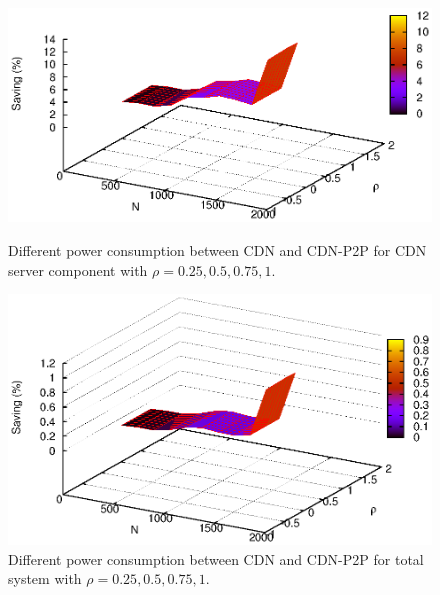 \documentclass[conference]{IEEEtran}
\begin{document}
\begin{figure}[ht]
\centering
\begin{minipage}[b]{0.4\linewidth}
	\includegraphics[scale=0.5]{graphs/diff3dimension.eps}
	\caption{Different power consumption between CDN and CDN-P2P for CDN server component with $\rho=0.25,0.5,0.75,1$.}
	\label{fig:diff1}
\end{minipage}
\hfill
\begin{minipage}[b]{0.4\linewidth}
	\includegraphics[scale=0.5]{graphs/diff3dimension2.eps}
	\caption{Different power consumption between CDN and CDN-P2P for total system with $\rho=0.25,0.5,0.75,1$.}
	\label{fig:diff2}
\end{minipage}
\label{fig:maindiff}
\end{figure}
\end{document}
